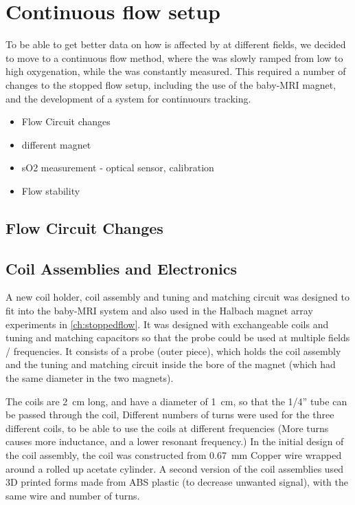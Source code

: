 \section{Continuous flow setup}

To be able to get better data on how \Ttwo is affected by \SOtwo at different fields, we decided to move to a continuous flow method, where the \SOtwo was slowly ramped from low to high oxygenation, while the \Ttwo was constantly measured.
This required a number of changes to the stopped flow setup, including the use of the baby-MRI magnet, and the development of a system for continuours \SOtwo tracking.


\begin{itemize}
\item Flow Circuit changes
\item different magnet
\item sO2 measurement - optical sensor, calibration
\item Flow stability
\end{itemize}

\subsection{Flow Circuit Changes}

\subsection{Coil Assemblies and Electronics}
\label{sec:exptsetup-coil}
A new coil holder, coil assembly and tuning and matching circuit was designed to fit into the baby-MRI system and also used in the Halbach magnet array experiments in  \autoref{ch:stoppedflow}.
It was designed with exchangeable coils and tuning and matching capacitors so that the probe could be used at multiple fields / frequencies.
It consists of a probe (outer piece), which holds the coil assembly and the tuning and matching circuit inside the bore of the magnet (which had the same diameter in the two magnets).

The coils are \SI{2}{cm} long, and have a diameter of \SI{1}{cm}, so that the 1/4'' tube can be passed through the coil,
Different numbers of turns were used for the three different coils, to be able to use the coils at different frequencies (More turns causes more inductance, and a lower resonant frequency.)
In the initial design of the coil assembly, the coil was constructed from \SI{0.67}{mm} Copper wire wrapped around a rolled up acetate cylinder.
A second version of the coil assemblies used 3D printed forms made from ABS plastic (to decrease unwanted signal), with the same wire and number of turns.

